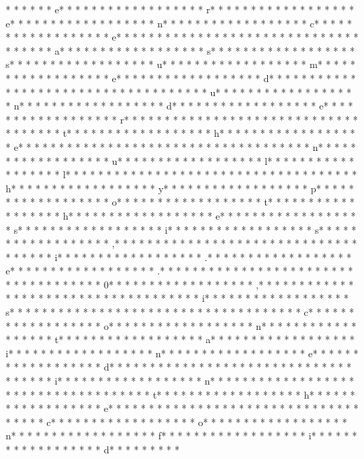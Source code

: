 *  *  * * *  * e* * *  * * *  * * *  *  * * *  *  * * *  * r* * *  * * *  * * *  *  * * *  *  * * *  * e* * *  * * *  * * *  *  * * *  *  * * *  * n* * *  * * *  * * *  *  * * *  *  * * *  * c* * *  * * *  * * *  *  * * *  *  * * *  * e* * *  * * *  * * *  *  * * *  *  * * *  *  * * *  * * *  * * *  *  * * *  *  * * *  * a* * *  * * *  * * *  *  * * *  *  * * *  * s* * *  * * *  * * *  *  * * *  *  * * *  * s* * *  * * *  * * *  *  * * *  *  * * *  * u* * *  * * *  * * *  *  * * *  *  * * *  * m* * *  * * *  * * *  *  * * *  *  * * *  * e* * *  * * *  * * *  *  * * *  *  * * *  * d* * *  * * *  * * *  *  * * *  *  * * *  *  * * *  * * *  * * *  *  * * *  *  * * *  * u* * *  * * *  * * *  *  * * *  *  * * *  * n* * *  * * *  * * *  *  * * *  *  * * *  * d* * *  * * *  * * *  *  * * *  *  * * *  * e* * *  * * *  * * *  *  * * *  *  * * *  * r* * *  * * *  * * *  *  * * *  *  * * *  *  * * *  * * *  * * *  *  * * *  *  * * *  * t* * *  * * *  * * *  *  * * *  *  * * *  * h* * *  * * *  * * *  *  * * *  *  * * *  * e* * *  * * *  * * *  *  * * *  *  * * *  *  * * *  * * *  * * *  *  * * *  *  * * *  * n* * *  * * *  * * *  *  * * *  *  * * *  * u* * *  * * *  * * *  *  * * *  *  * * *  * l* * *  * * *  * * *  *  * * *  *  * * *  * l* * *  * * *  * * *  *  * * *  *  * * *  *  * * *  * * *  * * *  *  * * *  *  * * *  * h* * *  * * *  * * *  *  * * *  *  * * *  * y* * *  * * *  * * *  *  * * *  *  * * *  * p* * *  * * *  * * *  *  * * *  *  * * *  * o* * *  * * *  * * *  *  * * *  *  * * *  * t* * *  * * *  * * *  *  * * *  *  * * *  * h* * *  * * *  * * *  *  * * *  *  * * *  * e* * *  * * *  * * *  *  * * *  *  * * *  * s* * *  * * *  * * *  *  * * *  *  * * *  * i* * *  * * *  * * *  *  * * *  *  * * *  * s* * *  * * *  * * *  *  * * *  *  * * *  * ,* * *  * * *  * * *  *  * * *  *  * * *  *  * * *  * * *  * * *  *  * * *  *  * * *  * i* * *  * * *  * * *  *  * * *  *  * * *  * .* * *  * * *  * * *  *  * * *  *  * * *  * e* * *  * * *  * * *  *  * * *  *  * * *  * .* * *  * * *  * * *  *  * * *  *  * * *  *  * * *  * * *  * * *  *  * * *  *  * * *  * 0* * *  * * *  * * *  *  * * *  *  * * *  * ,* * *  * * *  * * *  *  * * *  *  * * *  *  * * *  * * *  * * *  *  * * *  *  * * *  * i* * *  * * *  * * *  *  * * *  *  * * *  * s* * *  * * *  * * *  *  * * *  *  * * *  *  * * *  * * *  * * *  *  * * *  *  * * *  * c* * *  * * *  * * *  *  * * *  *  * * *  * o* * *  * * *  * * *  *  * * *  *  * * *  * n* * *  * * *  * * *  *  * * *  *  * * *  * t* * *  * * *  * * *  *  * * *  *  * * *  * a* * *  * * *  * * *  *  * * *  *  * * *  * i* * *  * * *  * * *  *  * * *  *  * * *  * n* * *  * * *  * * *  *  * * *  *  * * *  * e* * *  * * *  * * *  *  * * *  *  * * *  * d* * *  * * *  * * *  *  * * *  *  * * *  *  * * *  * * *  * * *  *  * * *  *  * * *  * i* * *  * * *  * * *  *  * * *  *  * * *  * n* * *  * * *  * * *  *  * * *  *  * * *  *  * * *  * * *  * * *  *  * * *  *  * * *  * t* * *  * * *  * * *  *  * * *  *  * * *  * h* * *  * * *  * * *  *  * * *  *  * * *  * e* * *  * * *  * * *  *  * * *  *  * * *  *  * * *  * * *  * * *  *  * * *  *  * * *  * c* * *  * * *  * * *  *  * * *  *  * * *  * o* * *  * * *  * * *  *  * * *  *  * * *  * n* * *  * * *  * * *  *  * * *  *  * * *  * f* * *  * * *  * * *  *  * * *  *  * * *  * i* * *  * * *  * * *  *  * * *  *  * * *  * d* * *  * * *  * * * 